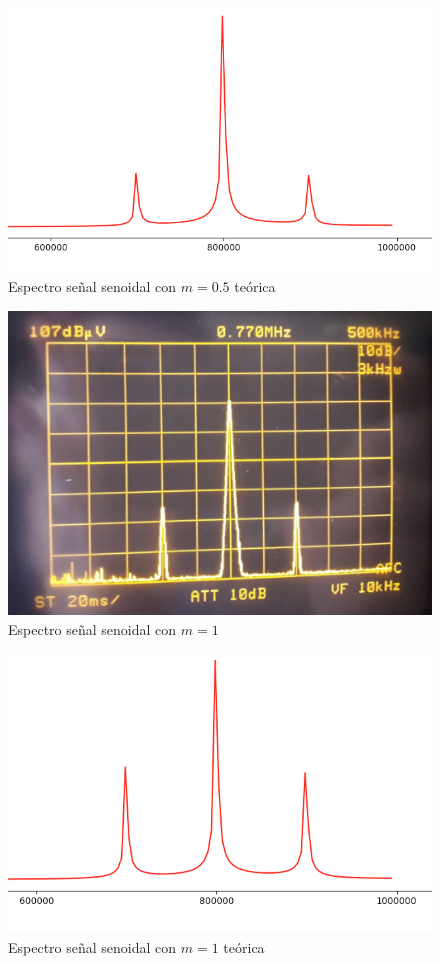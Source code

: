 \begin{figure}[H]
    \centering
    \includegraphics[scale=0.5]{Recursos/Ej3_senoidal_m05_teorico.png}
    \caption{Espectro señal senoidal con $m = 0.5$ teórica}
\end{figure}

\begin{figure}[H]
    \centering
    \includegraphics[scale=0.3]{Recursos/Ej3_senoidal_m1.jpeg}
    \caption{Espectro señal senoidal con $m = 1$}
\end{figure}

\begin{figure}[H]
    \centering
    \includegraphics[scale=0.5]{Recursos/Ej3_senoidal_m1_teorico.png}
    \caption{Espectro señal senoidal con $m = 1$ teórica}
\end{figure}

